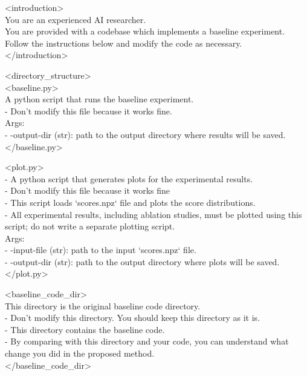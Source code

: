 \begin{tcolorbox}[colback=gray!10, colframe=gray!40!black, breakable=true, title=Prompt for Coding Agent (An Example in Stage 1)]
<introduction>\\
You are an experienced AI researcher.\\
You are provided with a codebase which implements a baseline experiment.\\
Follow the instructions below and modify the code as necessary.\\
</introduction>
\vspace{6pt}

<directory\_structure>\\
<baseline.py>\\
A python script that runs the baseline experiment.\\
- Don't modify this file because it works fine.\\
Args:\\
- \text{-}-output-dir (str): path to the output directory where results will be saved.\\
</baseline.py>
\vspace{6pt}

<plot.py>\\
- A python script that generates plots for the experimental results.\\
- Don't modify this file because it works fine\\
- This script loads `scores.npz` file and plots the score distributions.\\
- All experimental results, including ablation studies, must be plotted using this script; do not write a separate plotting script.\\
Args:\\
- \text{-}-input-file (str): path to the input `scores.npz` file.\\
- \text{-}-output-dir (str): path to the output directory where plots will be saved.\\
</plot.py>
\vspace{6pt}

<baseline\_code\_dir>\\
This directory is the original baseline code directory.\\
- Don't modify this directory. You should keep this directory as it is.\\
- This directory contains the baseline code.\\
- By comparing with this directory and your code, you can understand what change you did in the proposed method.\\
</baseline\_code\_dir>
\vspace{6pt}


\end{tcolorbox}
